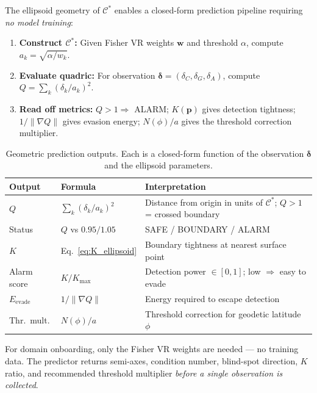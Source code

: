 \documentclass[11pt,a4paper]{article}
\newcommand{\Cman}{\mathcal{C}^*}
\begin{document}
The ellipsoid geometry of $\Cman$ enables a closed-form prediction
pipeline requiring \emph{no model training}:

\begin{enumerate}[nosep]
  \item \textbf{Construct $\Cman$:} Given Fisher VR weights
    $\mathbf{w}$ and threshold $\alpha$,
    compute $a_k = \sqrt{\alpha / w_k}$.
  \item \textbf{Evaluate quadric:} For observation
    $\boldsymbol{\delta} = (\delta_C, \delta_G, \delta_A)$, compute
    $Q = \sum_k (\delta_k / a_k)^2$.
  \item \textbf{Read off metrics:} $Q > 1 \Rightarrow$ ALARM;
    $K(\mathbf{p})$ gives detection tightness;
    $1/\|\nabla Q\|$ gives evasion energy;
    $N(\phi)/a$ gives the threshold correction multiplier.
\end{enumerate}

\begin{table}[H]
\centering
\caption{Geometric prediction outputs.  Each is a closed-form function
  of the observation $\boldsymbol{\delta}$ and the ellipsoid parameters.}
\label{tab:geo_predict}
\small\renewcommand{\arraystretch}{1.12}
\begin{tabular}{@{}lll@{}}
\toprule
\textbf{Output} & \textbf{Formula} & \textbf{Interpretation} \\
\midrule
$Q$ & $\sum_k (\delta_k / a_k)^2$ &
  Distance from origin in units of $\Cman$; $Q>1$ = crossed boundary \\
Status & $Q$ vs $0.95 / 1.05$ &
  SAFE / BOUNDARY / ALARM \\
$K$ & Eq.~\eqref{eq:K_ellipsoid} &
  Boundary tightness at nearest surface point \\
Alarm score & $K / K_{\max}$ &
  Detection power $\in [0,1]$; low $\Rightarrow$ easy to evade \\
$E_{\mathrm{evade}}$ & $1 / \|\nabla Q\|$ &
  Energy required to escape detection \\
Thr.\ mult. & $N(\phi) / a$ &
  Threshold correction for geodetic latitude $\phi$ \\
\bottomrule
\end{tabular}
\end{table}

\noindent
For domain onboarding, only the Fisher VR weights are needed --- no
training data.  The predictor returns semi-axes, condition number,
blind-spot direction, $K$ ratio, and recommended threshold multiplier
\emph{before a single observation is collected}.
\end{document}
